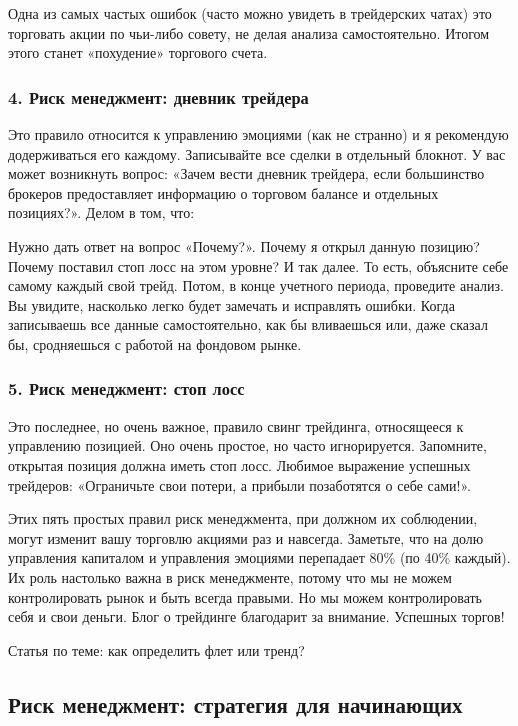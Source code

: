 \documentclass{book}
\begin{document}
Одна из самых частых ошибок (часто можно увидеть в трейдерских чатах)
это торговать акции по чьи-либо совету, не делая анализа
самостоятельно. Итогом этого станет «похудение» торгового счета.

\subsubsection{4. Риск менеджмент: дневник трейдера}

Это правило относится к управлению эмоциями (как не странно) и я рекомендую додерживаться его каждому. Записывайте все сделки в отдельный блокнот. У вас может возникнуть вопрос: «Зачем вести дневник трейдера, если большинство брокеров предоставляет информацию о торговом балансе и отдельных позициях?». Делом в том, что:

    Нужно дать ответ на вопрос «Почему?». Почему я открыл данную позицию? Почему поставил стоп лосс на этом уровне? И так далее. То есть, объясните себе самому каждый свой трейд. Потом, в конце учетного периода, проведите анализ. Вы увидите, насколько легко будет замечать и исправлять ошибки.
    Когда записываешь все данные самостоятельно, как бы вливаешься
    или, даже сказал бы, сродняешься с работой на фондовом рынке.

\subsubsection{5. Риск менеджмент: стоп лосс}

Это последнее, но очень важное, правило свинг трейдинга, относящееся к управлению позицией. Оно очень простое, но часто игнорируется. Запомните, открытая позиция должна иметь стоп лосс. Любимое выражение успешных трейдеров: «Ограничьте свои потери, а прибыли позаботятся о себе сами!».

Этих пять простых правил риск менеджмента, при должном их соблюдении, могут изменит вашу торговлю акциями раз и навсегда. Заметьте, что на долю управления капиталом и управления эмоциями перепадает 80\% (по 40\% каждый). Их роль настолько важна в риск менеджменте, потому что мы не можем контролировать рынок и быть всегда правыми. Но мы можем контролировать себя и свои деньги. Блог о трейдинге благодарит за внимание. Успешных торгов!


Статья по теме: как определить флет или тренд?

\subsection{Риск менеджмент: стратегия для начинающих}
\end{document}
